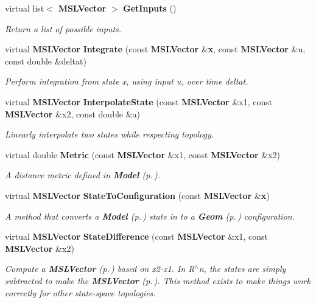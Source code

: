 \begin{CompactItemize}
virtual list$<$ {\bf MSLVector} $>$ {\bf Get\-Inputs} ()
\begin{CompactList}\small\item\em Return a list of possible inputs.\item\end{CompactList}\item 
virtual {\bf MSLVector} {\bf Integrate} (const {\bf MSLVector} \&{\bf x}, const {\bf MSLVector} \&u, const double \&deltat)
\begin{CompactList}\small\item\em Perform integration from state x, using input u, over time deltat.\item\end{CompactList}\item 
virtual {\bf MSLVector} {\bf Interpolate\-State} (const {\bf MSLVector} \&x1, const {\bf MSLVector} \&x2, const double \&a)
\begin{CompactList}\small\item\em Linearly interpolate two states while respecting topology.\item\end{CompactList}\item 
virtual double {\bf Metric} (const {\bf MSLVector} \&x1, const {\bf MSLVector} \&x2)
\begin{CompactList}\small\item\em A distance metric defined in {\bf Model} {\rm (p.\,\pageref{classModel})}.\item\end{CompactList}\item 
virtual {\bf MSLVector} {\bf State\-To\-Configuration} (const {\bf MSLVector} \&{\bf x})
\begin{CompactList}\small\item\em A method that converts a {\bf Model} {\rm (p.\,\pageref{classModel})} state in to a {\bf Geom} {\rm (p.\,\pageref{classGeom})} configuration.\item\end{CompactList}\item 
virtual {\bf MSLVector} {\bf State\-Difference} (const {\bf MSLVector} \&x1, const {\bf MSLVector} \&x2)
\begin{CompactList}\small\item\em Compute a {\bf MSLVector} {\rm (p.\,\pageref{classMSLVector})} based on x2-x1. In R$^\wedge$n, the states are simply subtracted to make the {\bf MSLVector} {\rm (p.\,\pageref{classMSLVector})}. This method exists to make things work correctly for other state-space topologies.\item\end{CompactList}\item 

\end{CompactItemize}

